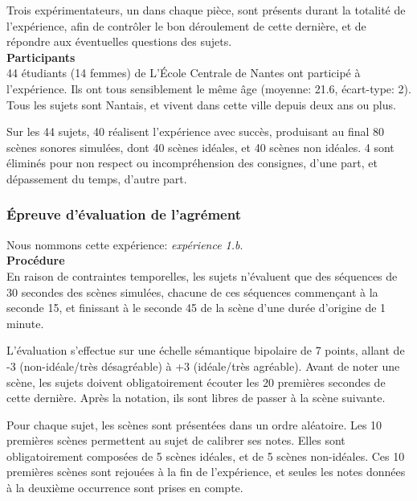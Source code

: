 Trois expérimentateurs, un dans chaque pièce, sont présents durant la totalité de l'expérience, afin de contrôler le bon déroulement de cette dernière, et de répondre aux éventuelles questions des sujets.  \\

{\setlength{\parindent}{0cm}\textbf{Participants}} \\

44 étudiants (14 femmes) de L’École Centrale de Nantes ont participé à l'expérience. Ils ont tous sensiblement le même âge (moyenne: 21.6, écart-type: 2). Tous les sujets sont Nantais, et vivent dans cette ville depuis deux ans ou plus.

Sur les 44 sujets, 40 réalisent l'expérience avec succès, produisant au final 80 scènes sonores simulées, dont 40 scènes idéales, et 40 scènes non idéales. 4 sont éliminés pour non respect ou incompréhension des consignes, d'une part, et dépassement du temps, d'autre part.

\subsubsection{Épreuve d'évaluation de l'agrément}
\label{sec:ch5_planExpEvaA}

Nous nommons cette expérience: \emph{expérience 1.b}. \\

{\setlength{\parindent}{0cm}\textbf{Procédure}} \\

En raison de contraintes temporelles, les sujets n'évaluent que des séquences de 30 secondes des scènes simulées, chacune de ces séquences commençant à la seconde 15, et finissant à le seconde 45 de la scène d'une durée d'origine de 1 minute.

L'évaluation s'effectue sur une échelle sémantique bipolaire de 7 points, allant de -3 (non-idéale/très désagréable) à +3 (idéale/très agréable). Avant de noter une scène, les sujets doivent obligatoirement écouter les 20 premières secondes de cette dernière. Après la notation, ils sont libres de passer à la scène suivante.

Pour chaque sujet, les scènes sont présentées dans un ordre aléatoire. Les 10 premières scènes permettent au sujet de calibrer ses notes. Elles sont obligatoirement composées de 5 scènes idéales, et de 5 scènes non-idéales. Ces 10 premières scènes sont rejouées à la fin de l'expérience, et seules les notes données à la deuxième occurrence sont prises en compte. 

